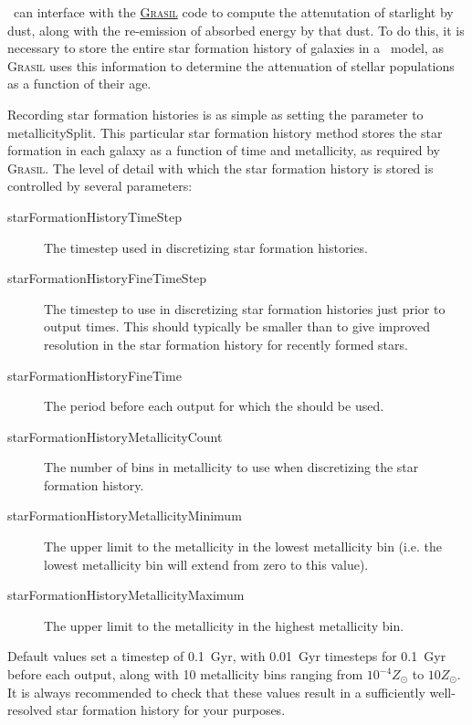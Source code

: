 \glc\ can interface with the \href{http://adlibitum.oat.ts.astro.it/silva/grasil/grasil.html}{\normalfont \scshape Grasil} code to compute the attenutation of starlight by dust, along with the re-emission of absorbed energy by that dust. To do this, it is necessary to store the entire star formation history of galaxies in a \glc\ model, as {\normalfont \scshape Grasil} uses this information to determine the attenuation of stellar populations as a function of their age.

Recording star formation histories is as simple as setting the {\normalfont \ttfamily [starFormationHistoriesMethod]} parameter to {\normalfont \ttfamily metallicitySplit}. This particular star formation history method stores the star formation in each galaxy as a function of time and metallicity, as required by {\normalfont \scshape Grasil}. The level of detail with which the star formation history is stored is controlled by several parameters:
\begin{description}
\item [{\normalfont \ttfamily starFormationHistoryTimeStep}] The timestep used in discretizing star formation histories.
\item [{\normalfont \ttfamily starFormationHistoryFineTimeStep}] The timestep to use in discretizing star formation histories just prior to output times. This should typically be smaller than {\normalfont \ttfamily [starFormationHistoryTimeStep]} to give improved resolution in the star formation history for recently formed stars.
\item [{\normalfont \ttfamily starFormationHistoryFineTime}] The period before each output for which the {\normalfont \ttfamily [starFormationHistoryFineTimeStep]} should be used.
\item [{\normalfont \ttfamily starFormationHistoryMetallicityCount}] The number of bins in metallicity to use when discretizing the star formation history.
\item [{\normalfont \ttfamily starFormationHistoryMetallicityMinimum}] The upper limit to the metallicity in the lowest metallicity bin (i.e. the lowest metallicity bin will extend from zero to this value).
\item [{\normalfont \ttfamily starFormationHistoryMetallicityMaximum}] The upper limit to the metallicity in the highest metallicity bin.
\end{description}
Default values set a timestep of 0.1~Gyr, with 0.01~Gyr timesteps for 0.1~Gyr before each output, along with 10 metallicity bins ranging from $10^{-4}Z_\odot$ to $10Z_\odot$. It is always recommended to check that these values result in a sufficiently well-resolved star formation history for your purposes.


